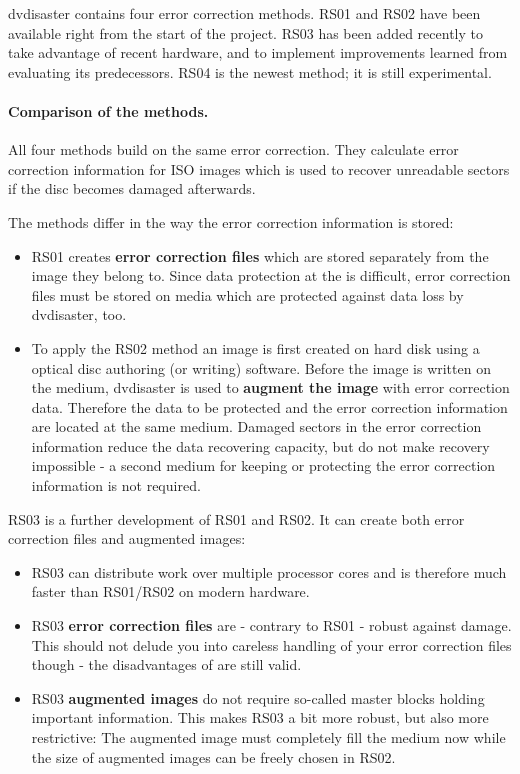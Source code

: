 dvdisaster contains four error correction methods.
RS01 and RS02 have been available right from the start of the project.
RS03 has been added recently to take advantage of 
recent hardware, and to implement improvements
learned from evaluating its predecessors.
RS04 is the newest method; it is still experimental.

\paragraph{Comparison of the methods.} All four methods build on the 
same  error correction. They calculate error 
correction information for ISO images which is used to recover unreadable sectors if 
the disc becomes damaged afterwards.

\smallskip

The methods differ in the way the error correction information is stored:

\begin{itemize}
\item  RS01 creates {\bf error correction files} which are stored separately 
from the image they belong to. Since data protection at 
the  is difficult, 
error correction files must be stored on media which are protected against data loss by dvdisaster, too.

\item To apply the RS02 method an image is first created on hard disk using a 
optical disc authoring (or writing) software. Before the image is written on the medium, 
dvdisaster is used to {\bf augment the image} with error correction data. 
Therefore the data to be protected and the error correction information are located at 
the same medium. Damaged sectors in the error correction information reduce the data recovering 
capacity, but do not make recovery impossible - a second medium for keeping or protecting the 
error correction information is not required.
\end{itemize}


RS03 is a further development of RS01 and RS02. 
It can create both error correction files and augmented images:

\begin{itemize}
\item RS03 can distribute work over multiple processor cores and is 
therefore much faster than RS01/RS02 on modern hardware.
\item RS03 {\bf error correction files} are - contrary to RS01 - robust 
against damage. This should not delude you into careless handling of your error 
correction files though - the disadvantages of  are 
still valid.
\item RS03 {\bf augmented images} do not require so-called master blocks 
holding important information. This makes RS03 a bit more robust, but also more restrictive: 
The augmented image must completely fill the medium now while the size of augmented images 
can be freely chosen in RS02.
\end{itemize}

